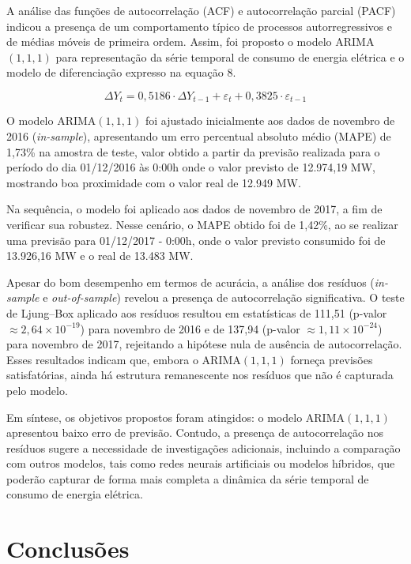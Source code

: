 \documentclass[journal]{IEEEtran}
\begin{document}
A análise das funções de autocorrelação (ACF) e autocorrelação parcial (PACF) indicou a presença de um comportamento típico de processos autorregressivos e de médias móveis de primeira ordem. Assim, foi proposto o modelo ARIMA$(1,1,1)$ para representação da série temporal de consumo de energia elétrica e o modelo de diferenciação expresso na equação 8.

\begin{equation}
\Delta Y_{t} = 0{,}5186 \cdot \Delta Y_{t-1} + \varepsilon_{t} + 0{,}3825 \cdot \varepsilon_{t-1}
\end{equation}


O modelo ARIMA$(1,1,1)$ foi ajustado inicialmente aos dados de novembro de 2016 (\emph{in-sample}), apresentando um erro percentual absoluto médio (MAPE) de 1,73\% na amostra de teste, valor obtido a partir da previsão realizada para o período do dia 01/12/2016 às 0:00h onde o valor previsto de 12.974,19 MW, mostrando boa proximidade com o valor real de 12.949 MW. 

Na sequência, o modelo foi aplicado aos dados de novembro de 2017, a fim de verificar sua robustez. Nesse cenário, o MAPE obtido foi de 1,42\%, ao se realizar uma previsão para 01/12/2017 - 0:00h, onde o valor previsto consumido foi de 13.926,16 MW e o real de 13.483 MW.

Apesar do bom desempenho em termos de acurácia, a análise dos resíduos (\emph{in-sample} e \emph{out-of-sample}) revelou a presença de autocorrelação significativa. O teste de Ljung–Box aplicado aos resíduos resultou em estatísticas de 111,51 (p-valor $\approx 2,64\times10^{-19}$) para novembro de 2016 e de 137,94 (p-valor $\approx 1,11\times10^{-24}$) para novembro de 2017, rejeitando a hipótese nula de ausência de autocorrelação. Esses resultados indicam que, embora o ARIMA$(1,1,1)$ forneça previsões satisfatórias, ainda há estrutura remanescente nos resíduos que não é capturada pelo modelo.

Em síntese, os objetivos propostos foram atingidos: o modelo ARIMA$(1,1,1)$ apresentou baixo erro de previsão. Contudo, a presença de autocorrelação nos resíduos sugere a necessidade de investigações adicionais, incluindo a comparação com outros modelos, tais como redes neurais artificiais ou modelos híbridos, que poderão capturar de forma mais completa a dinâmica da série temporal de consumo de energia elétrica.



\section{Conclusões}
\label{sec_conclusoes}
\end{document}
